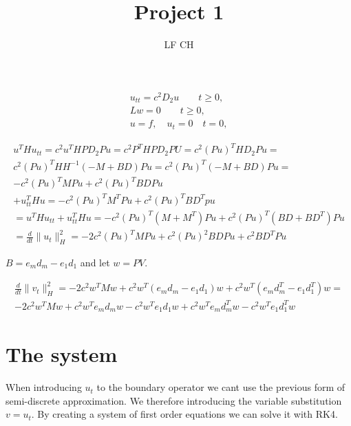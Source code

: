 \documentclass[a4paper]{article}
\title{Project 1}
\author{LF CH}
\begin{document}
\maketitle


\begin{equation}
	\begin{aligned}
	u_{tt} = c^2D_2u \quad\quad t \ge 0,\\
	Lw = 0 \quad\quad t \ge 0, \\
	u = f, \quad u_t=0 \quad t=0,
	\end{aligned}
\end{equation}

\begin{equation}
	\begin{aligned}
		u^{T}Hu_{tt}=c^2u^{T}HPD_2Pu = c^2P^{T}HPD_2PU=c^2(Pu)^{T}HD_2Pu= \\
c^2(Pu)^{T}H H^{-1}(-M+BD)Pu = c^2(Pu)^{T}(-M+BD)Pu =\\
-c^2(Pu)^{T}MPu + c^2(Pu)^{T}BDPu \\
+ u^{T}_{tt}Hu = -c^2(Pu)^{T}M^{T}Pu + c^2(Pu)^{T}BD^{T}pu\\ \hline
= u^{T}Hu_{t t} + u^{T}_{t t}Hu = -c^2(Pu)^{T}(M+M^{T})Pu + c^2(Pu)^{T}(BD + BD^{T})Pu \\
= \frac{d}{dt} \|u_t\|^{2}_H = -2c^{2}(Pu)^{T}MPu + c^2(Pu)^2BDPu + c^2BD^{T}Pu
	\end{aligned}
\nonumber
\end{equation}

$B = e_md_m-e_1d_1$ and let $w = PV$. 

\begin{equation}
\begin{aligned}
	\frac{d}{dt}\|v_t\|^2_H = -2c^2w^{T}Mw +c^2w^{T}(e_md_m-e_1d_1)w + c^2w^{T}(e_md^{T}_m - e_1d^{T}_1)w = \\
	-2c^2w^{T}Mw + c^2w^{T}e_md_mw - c^2w^{T}e_1d_1w + c^2w^{T}e_md^{T}_mw - c^2w^{T}e_1d^{T}_1w 
\end{aligned}
\nonumber
\end{equation}

\section{The system}
When introducing $u_t$ to the boundary operator we cant use the previous form of semi-discrete approximation. We therefore introducing the variable substitution $v = u_t$. By creating a system of first order equations we can solve it with RK4. 
\end{document}
